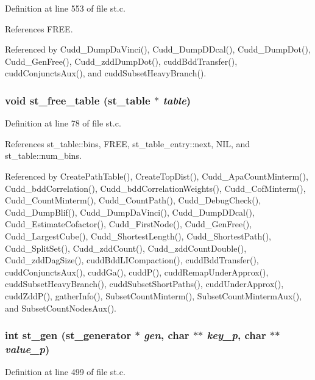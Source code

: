Definition at line 553 of file st.c.

References FREE.

Referenced by Cudd\_\-Dump\-Da\-Vinci(), Cudd\_\-Dump\-DDcal(), Cudd\_\-Dump\-Dot(), Cudd\_\-Gen\-Free(), Cudd\_\-zdd\-Dump\-Dot(), cudd\-Bdd\-Transfer(), cudd\-Conjuncts\-Aux(), and cudd\-Subset\-Heavy\-Branch().
\subsubsection{\setlength{\rightskip}{0pt plus 5cm}void st\_\-free\_\-table (\bf{st\_\-table} $\ast$ {\em table})}\label{st_8c_93394fd99c5fa4fbcce2be9717abee45}




Definition at line 78 of file st.c.

References st\_\-table::bins, FREE, st\_\-table\_\-entry::next, NIL, and st\_\-table::num\_\-bins.

Referenced by Create\-Path\-Table(), Create\-Top\-Dist(), Cudd\_\-Apa\-Count\-Minterm(), Cudd\_\-bdd\-Correlation(), Cudd\_\-bdd\-Correlation\-Weights(), Cudd\_\-Cof\-Minterm(), Cudd\_\-Count\-Minterm(), Cudd\_\-Count\-Path(), Cudd\_\-Debug\-Check(), Cudd\_\-Dump\-Blif(), Cudd\_\-Dump\-Da\-Vinci(), Cudd\_\-Dump\-DDcal(), Cudd\_\-Estimate\-Cofactor(), Cudd\_\-First\-Node(), Cudd\_\-Gen\-Free(), Cudd\_\-Largest\-Cube(), Cudd\_\-Shortest\-Length(), Cudd\_\-Shortest\-Path(), Cudd\_\-Split\-Set(), Cudd\_\-zdd\-Count(), Cudd\_\-zdd\-Count\-Double(), Cudd\_\-zdd\-Dag\-Size(), cudd\-Bdd\-LICompaction(), cudd\-Bdd\-Transfer(), cudd\-Conjuncts\-Aux(), cudd\-Ga(), cudd\-P(), cudd\-Remap\-Under\-Approx(), cudd\-Subset\-Heavy\-Branch(), cudd\-Subset\-Short\-Paths(), cudd\-Under\-Approx(), cudd\-Zdd\-P(), gather\-Info(), Subset\-Count\-Minterm(), Subset\-Count\-Minterm\-Aux(), and Subset\-Count\-Nodes\-Aux().
\subsubsection{\setlength{\rightskip}{0pt plus 5cm}int st\_\-gen (\bf{st\_\-generator} $\ast$ {\em gen}, char $\ast$$\ast$ {\em key\_\-p}, char $\ast$$\ast$ {\em value\_\-p})}\label{st_8c_3fcaece6163a224ed605652118da1eef}




Definition at line 499 of file st.c.

